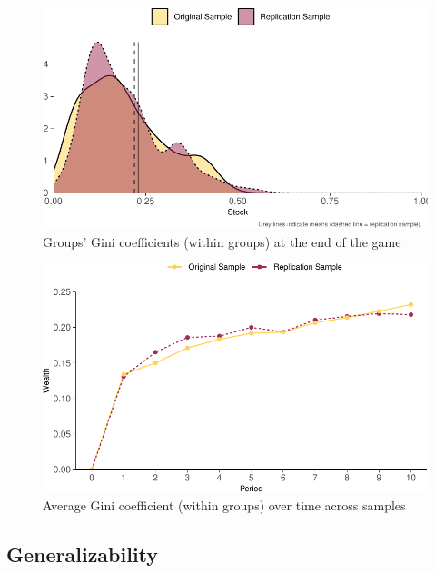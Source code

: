 \documentclass[
  authoryear,
  preprint,
  3p]{elsarticle}
\begin{document}
\begin{figure}

{\centering \includegraphics{paper_files/figure-pdf/giniDistributionViz-1.pdf}

}

\caption{Groups' Gini coefficients (within groups) at the end of the
game}

\end{figure}

\begin{figure}

{\centering \includegraphics{paper_files/figure-pdf/unnamed-chunk-1-1.pdf}

}

\caption{Average Gini coefficient (within groups) over time across
samples}

\end{figure}

\hypertarget{generalizability}{%
\subsection{Generalizability}\label{generalizability}}
\end{document}
